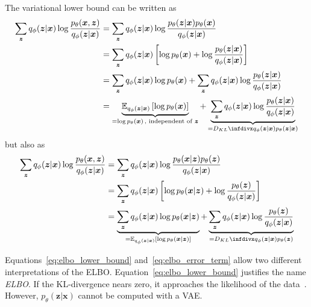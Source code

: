 The variational lower bound can be written as
\begin{align}
    \sum_{\bm{z}} q_\phi(\bm{z}|\bm{x}) \log \frac{p_\theta(\bm{x},\bm{z})}{q_\phi(\bm{z}|\bm{x})} &= \sum_{\bm{z}} q_\phi(\bm{z}|\bm{x}) \log \frac{p_\theta(\bm{z}|\bm{x})p_\theta(\bm{x})}{q_\phi(\bm{z}|\bm{x})}\\
    &= \sum_{\bm{z}} q_\phi(\bm{z}|\bm{x}) \left[ \log p_\theta(\bm{x}) + \log \frac{p_\theta(\bm{z}|\bm{x})}{q_\phi(\bm{z}|\bm{x})} \right]\\
    &= \sum_{\bm{z}} q_\phi(\bm{z}|\bm{x})\log p_\theta(\bm{x}) + \sum_{\bm{z}} q_\phi(\bm{z}|\bm{x})\log \frac{p_\theta(\bm{z}|\bm{x})}{q_\phi(\bm{z}|\bm{x})}\\
    &= \underbrace{\mathbb{E}_{q_\phi(\bm{z}|\bm{x})} \left[ \log p_\theta(\bm{x}) \right]}_{=\log p_\theta(\bm{x})\, \text{, independent of $\bm{z}$}} + \underbrace{\sum_{\bm{z}} q_\phi(\bm{z}|\bm{x})\log \frac{p_\theta(\bm{z}|\bm{x})}{q_\phi(\bm{z}|\bm{x})}}_{=\kldiv{q_\phi(\bm{z}|\bm{x})}{p_\theta(\bm{z}|\bm{x})}} \label{eq:elbo_lower_bound}
\end{align}
but also as
\begin{align}
    \sum_{\bm{z}} q_\phi(\bm{z}|\bm{x}) \log \frac{p_\theta(\bm{x},\bm{z})}{q_\phi(\bm{z}|\bm{x})} &= \sum_{\bm{z}} q_\phi(\bm{z}|\bm{x}) \log \frac{p_\theta(\bm{x}|\bm{z})p_\theta(\bm{z})}{q_\phi(\bm{z}|\bm{x})}\\
    &= \sum_{\bm{z}} q_\phi(\bm{z}|\bm{x}) \left[ \log p_\theta(\bm{x}|\bm{z}) + \log \frac{p_\theta(\bm{z})}{q_\phi(\bm{z}|\bm{x})} \right]\\
    &= \underbrace{\sum_{\bm{z}} q_\phi(\bm{z}|\bm{x})\log p_\theta(\bm{x}|\bm{z})}_{=\mathbb{E}_{q_\phi(\bm{z}|\bm{x})}\left[ \log p_\theta(\bm{x}|\bm{z}) \right]} + \underbrace{\sum_{\bm{z}} q_\phi(\bm{z}|\bm{x})\log \frac{p_\theta(\bm{z})}{q_\phi(\bm{z}|\bm{x})}}_{=\kldiv{q_\phi(\bm{z}|\bm{x})}{p_\theta(\bm{z})}} \label{eq:elbo_error_term}
\end{align}

Equations~\ref{eq:elbo_lower_bound} and~\ref{eq:elbo_error_term} allow two different interpretations of the \ac{ELBO}.
Equation~\ref{eq:elbo_lower_bound} justifies the name \textit{\acl{ELBO}}.
If the \ac{KL-divergence} nears zero, it approaches the likelihood of the data~\citep[p. 18]{kingma2019introduction}.
However, $p_\theta(\bm{z}|\bm{x})$ cannot be computed with a \ac{VAE}.

